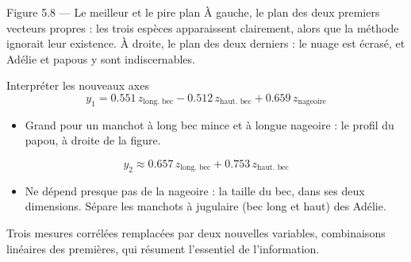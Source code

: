 \begin{frame}{Figure 5.8 --- Le meilleur et le pire plan}
  \small À gauche, le plan des deux premiers vecteurs propres : les trois
  espèces apparaissent clairement, alors que la méthode ignorait leur
  existence. À droite, le plan des deux derniers : le nuage est écrasé, et
  Adélie et papous y sont indiscernables.
\end{frame}

\begin{frame}{Interpréter les nouveaux axes}
  \[
    y_1=\num{0.551}\,z_{\text{long.\ bec}}-\num{0.512}\,z_{\text{haut.\ bec}}
      +\num{0.659}\,z_{\text{nageoire}}
  \]
  \begin{itemize}
    \item Grand pour un manchot à long bec mince et à longue nageoire : le
      profil du papou, à droite de la figure.
  \end{itemize}
  \[
    y_2\approx\num{0.657}\,z_{\text{long.\ bec}}+\num{0.753}\,z_{\text{haut.\ bec}}
  \]
  \begin{itemize}
    \item Ne dépend presque pas de la nageoire : la taille du bec, dans ses
      deux dimensions. Sépare les manchots à jugulaire (bec long et haut)
      des Adélie.
  \end{itemize}
  \vspace{4pt}
  Trois mesures corrélées remplacées par deux nouvelles variables,
  combinaisons linéaires des premières, qui résument l'essentiel de
  l'information.
\end{frame}

